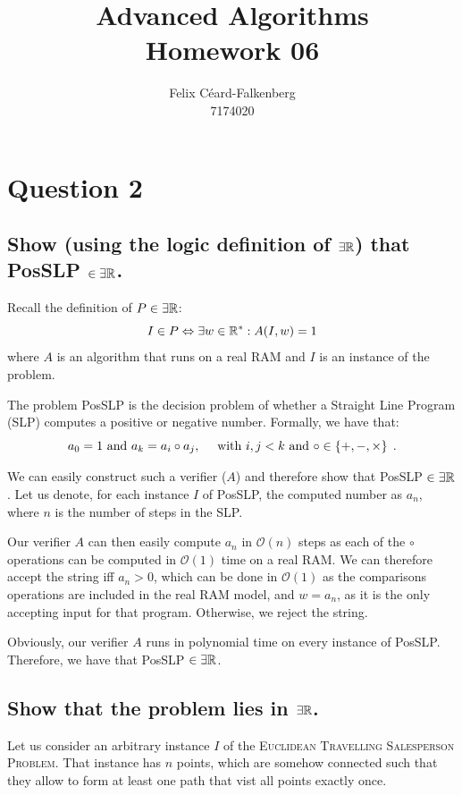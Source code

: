 \documentclass{article}
\title{Advanced Algorithms\\Homework 06}
\author{Felix Céard-Falkenberg\\7174020}
\begin{document}
\section{Question 2}
\subsection{\textbf{Show (using the logic definition of $\exists \mathbb{R}$) that PosSLP $\in \exists \mathbb{R}$.}}

Recall the definition of $P\in \exists \mathbb{R}$:
\begin{equation*}
    I \in P \Leftrightarrow \exists w \in \mathbb{R}^*: A(I, w) = 1
\end{equation*}
where $A$ is an algorithm that runs on a real RAM and $I$ is an instance of the problem.

The problem PosSLP is the decision problem of whether a Straight Line Program (SLP) computes a positive or negative number.
Formally, we have that:
\begin{equation*}
    a_0 = 1 \text{ and } a_k = a_i \circ a_j, \quad \text{ with } i, j < k \text{ and } \circ \in \left\{ +, -, \times \right\}\;.
\end{equation*}

We can easily construct such a verifier ($A$) and therefore show that PosSLP $\in \exists \mathbb{R}$.
Let us denote, for each instance $I$ of PosSLP, the computed number as $a_n$, where $n$ is the number of steps in the SLP.

Our verifier $A$ can then easily compute $a_n$ in $\mathcal{O}(n)$ steps as each of the $\circ$ operations can be computed in $\mathcal{O}(1)$ time on a real RAM. 
We can therefore accept the string iff $a_n > 0$, which can be done in $\mathcal{O}(1)$ as the comparisons operations are included in the real RAM model, and $w = a_n$, as it is the only accepting input for that program. Otherwise, we reject the string.

Obviously, our verifier $A$ runs in polynomial time on every instance of PosSLP. Therefore, we have that PosSLP $\in \exists \mathbb{R}$.

\subsection{\textbf{Show that the problem lies in $\exists \mathbb{R}$.}}

Let us consider an arbitrary instance $I$ of the \textsc{Euclidean Travelling Salesperson Problem}. That instance has $n$ points, which are somehow connected such that they allow to form at least one path that vist all points exactly once. 
\end{document}
